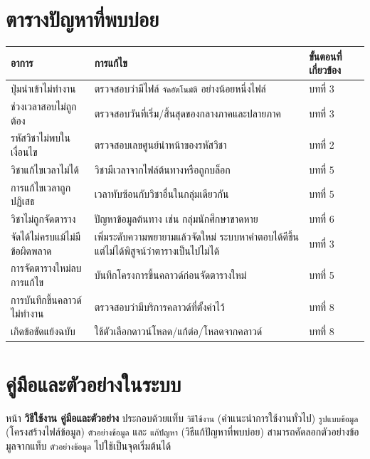 
\section{ตารางปัญหาที่พบบ่อย}

\begin{longtable}{L{4.5cm}L{6cm}L{4cm}}
\toprule
\textbf{อาการ} & \textbf{การแก้ไข} & \textbf{ขั้นตอนที่เกี่ยวข้อง} \\
\midrule
ปุ่มนำเข้าไม่ทำงาน & ตรวจสอบว่ามีไฟล์ \texttt{จัดอัตโนมัติ} อย่างน้อยหนึ่งไฟล์ & บทที่ 3 \\
ช่วงเวลาสอบไม่ถูกต้อง & ตรวจสอบวันที่เริ่ม/สิ้นสุดของกลางภาคและปลายภาค & บทที่ 3 \\
รหัสวิชาไม่พบในเงื่อนไข & ตรวจสอบเลขศูนย์นำหน้าของรหัสวิชา & บทที่ 2 \\
วิชาแก้ไขเวลาไม่ได้ & วิชามีเวลาจากไฟล์ต้นทางหรือถูกบล็อก & บทที่ 5 \\
การแก้ไขเวลาถูกปฏิเสธ & เวลาทับซ้อนกับวิชาอื่นในกลุ่มเดียวกัน & บทที่ 5 \\
วิชาไม่ถูกจัดตาราง & ปัญหาข้อมูลต้นทาง เช่น กลุ่มนักศึกษาขาดหาย & บทที่ 6 \\
จัดได้ไม่ครบแม้ไม่มีข้อผิดพลาด & เพิ่มระดับความพยายามแล้วจัดใหม่ ระบบหาคำตอบได้ดีขึ้นแต่ไม่ได้พิสูจน์ว่าตารางเป็นไปไม่ได้ & บทที่ 3 \\
การจัดตารางใหม่ลบการแก้ไข & บันทึกโครงการขึ้นคลาวด์ก่อนจัดตารางใหม่ & บทที่ 5 \\
การบันทึกขึ้นคลาวด์ไม่ทำงาน & ตรวจสอบว่ามีบริการคลาวด์ที่ตั้งค่าไว้ & บทที่ 8 \\
เกิดข้อขัดแย้งฉบับ & ใช้ตัวเลือกดาวน์โหลด/แก้ต่อ/โหลดจากคลาวด์ & บทที่ 8 \\
\bottomrule
\end{longtable}

\section{คู่มือและตัวอย่างในระบบ}

หน้า \textbf{วิธีใช้งาน คู่มือและตัวอย่าง} ประกอบด้วยแท็บ
\texttt{วิธีใช้งาน} (คำแนะนำการใช้งานทั่วไป) \texttt{รูปแบบข้อมูล}
(โครงสร้างไฟล์ข้อมูล) \texttt{ตัวอย่างข้อมูล} และ \texttt{แก้ปัญหา}
(วิธีแก้ปัญหาที่พบบ่อย) สามารถคัดลอกตัวอย่างข้อมูลจากแท็บ
\texttt{ตัวอย่างข้อมูล} ไปใช้เป็นจุดเริ่มต้นได้

